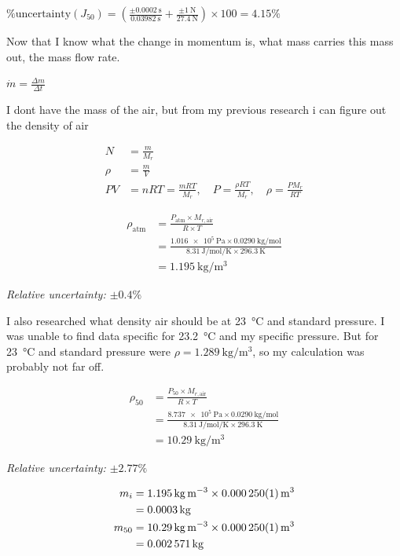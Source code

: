 \documentclass[12pt,a4paper]{article}
\begin{document}
$\%\text{uncertainty}(J_{50}) = \left(\frac{\pm \SI{0.0002}{\second}}{\SI{0.03982}{\second}} + \frac{\pm \SI{1}{\newton}}{\SI{27.4}{\newton}}\right) \times 100 = 4.15\%$

Now that I know what the change in momentum is, what mass carries this mass out, the mass flow rate.

$\dot{m} = \frac{\Delta m}{\Delta t}$

I dont have the mass of the air, but from my previous research i can figure out the density of air

\begin{align}
N &= \frac{m}{M_r} \\
\rho &= \frac{m}{V} \\
PV &= nRT = \frac{mRT}{M_r}, \quad P = \frac{\rho RT}{M_r}, \quad \rho = \frac{PM_r}{RT}
\end{align}

\begin{align}
\rho_{\text{atm}} &= \frac{P_{\text{atm}} \times M_{r,\text{air}}}{R \times T} \\
&= \frac{\SI{1.016e5}{\pascal} \times \SI{0.0290}{\kilo\gram\per\mol}}{\SI{8.31}{\joule\per\mol\per\kelvin} \times \SI{296.3}{\kelvin}} \\
&= \SI{1.195}{\kilo\gram\per\meter\cubed}
\end{align}

\textit{Relative uncertainty: $\pm 0.4\%$}

I also researched what density air should be at \SI{23}{\celsius} and standard pressure. I was unable to find data specific for \SI{23.2}{\celsius} and my specific pressure. But for \SI{23}{\celsius} and standard pressure were $\rho = \SI{1.289}{\kilo\gram\per\meter\cubed}$, so my calculation was probably not far off.

\begin{align}
\rho_{50} &= \frac{P_{50} \times M_{r,\text{air}}}{R \times T} \\
&= \frac{\SI{8.737e5}{\pascal} \times \SI{0.0290}{\kilo\gram\per\mol}}{\SI{8.31}{\joule\per\mol\per\kelvin} \times \SI{296.3}{\kelvin}} \\
&= \SI{10.29}{\kilo\gram\per\meter\cubed}
\end{align}

\textit{Relative uncertainty: $\pm 2.77\%$}

\begin{align}
m_i &= \SI{1.195}{\kilo\gram\per\meter\cubed} \times \SI{0.000250 \pm 0.000001}{\meter\cubed} \\
&= \SI{0.0003}{\kilo\gram} \\
m_{50} &= \SI{10.29}{\kilo\gram\per\meter\cubed} \times \SI{0.000250 \pm 0.000001}{\meter\cubed} \\
&= \SI{0.002571}{\kilo\gram}
\end{align}
\end{document}
